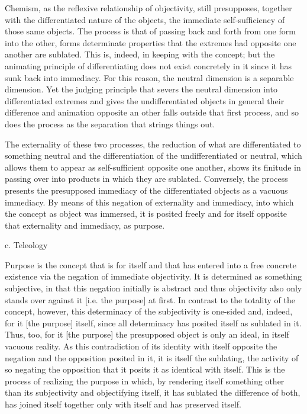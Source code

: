 Chemism, as the reflexive relationship of objectivity,
still presupposes, together with
the differentiated nature of the objects,
the immediate self-sufficiency of those same objects.
The process is that of passing back and forth
from one form into the other,
forms determinate properties that the extremes
had opposite one another are sublated.
This is, indeed, in keeping with the concept;
but the animating principle of differentiating
does not exist concretely in it
since it has sunk back into immediacy.
For this reason, the neutral dimension
is a separable dimension.
Yet the judging principle that severs
the neutral dimension into differentiated extremes
and gives the undifferentiated objects in general
their difference and animation opposite an other
falls outside that first process,
and so does the process as
the separation that strings things out.

The externality of these two processes,
the reduction of what are differentiated to something neutral
and the differentiation of the undifferentiated or neutral,
which allows them to appear as self-sufficient opposite one another,
shows its finitude in passing over into products
in which they are sublated.
Conversely, the process presents the presupposed immediacy
of the differentiated objects as a vacuous immediacy.
By means of this negation of externality and immediacy,
into which the concept as object was immersed,
it is posited freely and for itself
opposite that externality and immediacy,
as purpose.

c. Teleology

Purpose is the concept that is for itself
and that has entered into a free concrete existence
via the negation of immediate objectivity.
It is determined as something subjective,
in that this negation initially is abstract
and thus objectivity also only stands
over against it [i.e. the purpose] at first.
In contrast to the totality of the concept, however,
this determinacy of the subjectivity is one-sided and, indeed,
for it [the purpose] itself, since all determinacy has posited
itself as sublated in it.
Thus, too, for it [the purpose] the presupposed object is
only an ideal, in itself vacuous reality.
As this contradiction of its identity
with itself opposite the negation
and the opposition posited in it,
it is itself the sublating,
the activity of so negating the opposition
that it posits it as identical with itself.
This is the process of realizing the purpose in which,
by rendering itself something other than its subjectivity
and objectifying itself,
it has sublated the difference of both,
has joined itself together only with itself
and has preserved itself.

